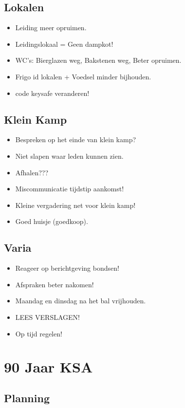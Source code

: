 \documentclass[pdftex,12pt,a4paper,english,titlepage]{article}
\begin{document}
\subsection{Lokalen}
\begin{itemize}
	\item Leiding meer opruimen.
	\item Leidingslokaal =  Geen dampkot!
	\item WC's: Bierglazen weg, Bakstenen weg, Beter opruimen.
	\item Frigo id lokalen + Voedsel minder bijhouden.
	\item code keysafe veranderen!
\end{itemize}

\subsection{Klein Kamp}
\begin{itemize}
	\item Bespreken op het einde van klein kamp?
	\item Niet slapen waar leden kunnen zien.
	\item Afhalen???
	\item Miscommunicatie tijdstip aankomst!
	\item Kleine vergadering net voor klein kamp!
	\item Goed huisje (goedkoop).
\end{itemize}

\subsection{Varia}
\begin{itemize}
	\item Reageer op berichtgeving bondsen!
	\item Afspraken beter nakomen!
	\item Maandag en dinsdag na het bal vrijhouden.
	\item LEES VERSLAGEN!
	\item Op tijd regelen!
\end{itemize}

\section{90 Jaar KSA}

\subsection{Planning}
\end{document}
